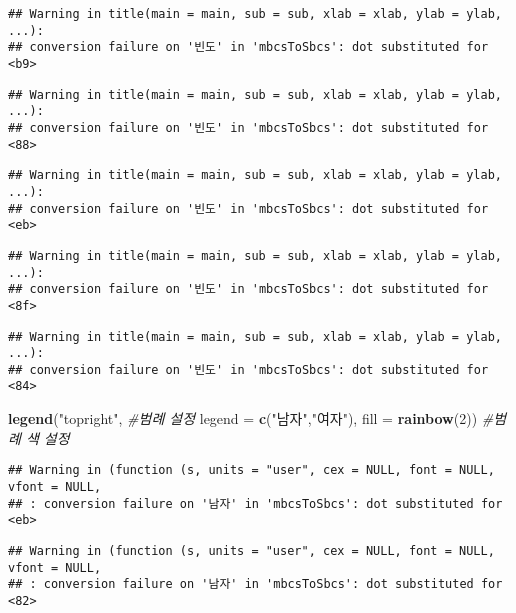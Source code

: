 \documentclass[
]{article}
\newenvironment{Shaded}{\begin{snugshade}}{\end{snugshade}}
\newcommand{\AttributeTok}[1]{\textcolor[rgb]{0.13,0.29,0.53}{#1}}
\newcommand{\CommentTok}[1]{\textcolor[rgb]{0.56,0.35,0.01}{\textit{#1}}}
\newcommand{\DecValTok}[1]{\textcolor[rgb]{0.00,0.00,0.81}{#1}}
\newcommand{\FunctionTok}[1]{\textcolor[rgb]{0.13,0.29,0.53}{\textbf{#1}}}
\newcommand{\NormalTok}[1]{#1}
\newcommand{\StringTok}[1]{\textcolor[rgb]{0.31,0.60,0.02}{#1}}
\begin{document}
\begin{verbatim}
## Warning in title(main = main, sub = sub, xlab = xlab, ylab = ylab, ...):
## conversion failure on '빈도' in 'mbcsToSbcs': dot substituted for <b9>
\end{verbatim}

\begin{verbatim}
## Warning in title(main = main, sub = sub, xlab = xlab, ylab = ylab, ...):
## conversion failure on '빈도' in 'mbcsToSbcs': dot substituted for <88>
\end{verbatim}

\begin{verbatim}
## Warning in title(main = main, sub = sub, xlab = xlab, ylab = ylab, ...):
## conversion failure on '빈도' in 'mbcsToSbcs': dot substituted for <eb>
\end{verbatim}

\begin{verbatim}
## Warning in title(main = main, sub = sub, xlab = xlab, ylab = ylab, ...):
## conversion failure on '빈도' in 'mbcsToSbcs': dot substituted for <8f>
\end{verbatim}

\begin{verbatim}
## Warning in title(main = main, sub = sub, xlab = xlab, ylab = ylab, ...):
## conversion failure on '빈도' in 'mbcsToSbcs': dot substituted for <84>
\end{verbatim}

\begin{Shaded}
\begin{Highlighting}[]
\FunctionTok{legend}\NormalTok{(}\StringTok{"topright"}\NormalTok{,              }\CommentTok{\#범례 설정}
       \AttributeTok{legend =} \FunctionTok{c}\NormalTok{(}\StringTok{"남자"}\NormalTok{,}\StringTok{"여자"}\NormalTok{),}
       \AttributeTok{fill =} \FunctionTok{rainbow}\NormalTok{(}\DecValTok{2}\NormalTok{))       }\CommentTok{\#범례 색 설정}
\end{Highlighting}
\end{Shaded}

\begin{verbatim}
## Warning in (function (s, units = "user", cex = NULL, font = NULL, vfont = NULL,
## : conversion failure on '남자' in 'mbcsToSbcs': dot substituted for <eb>
\end{verbatim}

\begin{verbatim}
## Warning in (function (s, units = "user", cex = NULL, font = NULL, vfont = NULL,
## : conversion failure on '남자' in 'mbcsToSbcs': dot substituted for <82>
\end{verbatim}
\end{document}
